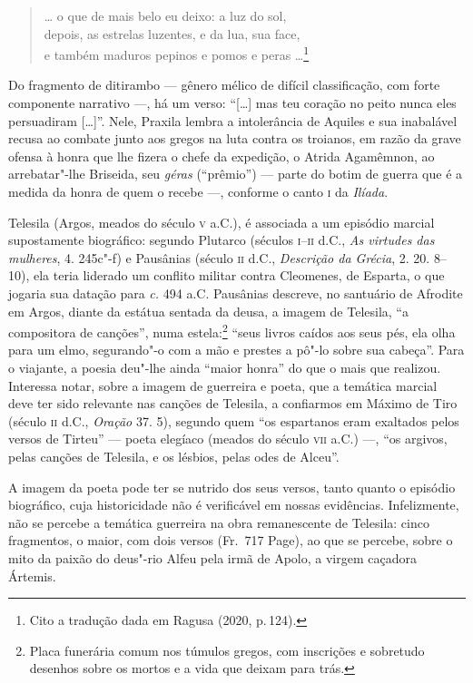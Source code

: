 \begin{quote}
\ldots{} o que de mais belo eu deixo: a luz do sol,\\
 depois, as estrelas luzentes, e da lua, sua face,\\
e também maduros pepinos e pomos e peras \ldots{}\footnote{Cito a tradução dada em Ragusa (2020, p.\,124).}
\end{quote}

Do fragmento de ditirambo --- gênero mélico de difícil classificação, com forte
componente narrativo ---, há um verso: ``[\ldots{}] mas teu coração no peito nunca
eles persuadiram [\ldots{}]”. Nele, Praxila lembra a intolerância de Aquiles e sua
inabalável recusa ao combate junto aos gregos na luta contra os troianos, em razão da
grave ofensa à honra que lhe fizera o chefe da expedição, o Atrida
Agamêmnon, ao arrebatar"-lhe Briseida, seu \textit{géras} (“prêmio”) --- parte do
botim de guerra que é a medida da honra de quem o recebe ---, conforme o canto \textsc{i}
da \textit{Ilíada}.

Telesila (Argos, meados do século \textsc{v} a.C.), é associada a um episódio marcial
supostamente biográfico: segundo Plutarco (séculos \textsc{i}--\textsc{ii} d.C., \textit{As
virtudes das mulheres}, 4. 245c"-f) e Pausânias (século \textsc{ii} d.C.,
\textit{Descrição da Grécia}, 2. 20. 8--10), ela teria liderado um conflito
militar contra Cleomenes, de Esparta, o que jogaria sua datação para \textit{c.}
494 a.C. Pausânias descreve, no santuário de Afrodite em Argos, diante da
estátua sentada da deusa, a imagem de Telesila, ``a compositora de
canções”, numa estela:\footnote{ Placa funerária comum nos túmulos gregos, com
inscrições e sobretudo desenhos sobre os mortos e a vida que deixam para trás.} ``seus livros caídos aos seus
pés, ela olha para um elmo, segurando"-o com a mão e prestes a pô"-lo sobre sua
cabeça”. Para o viajante, a poesia deu"-lhe ainda ``maior honra” do
que o mais que realizou. Interessa notar, sobre a imagem de guerreira e poeta,
que a temática marcial deve ter sido relevante nas canções de Telesila, a
confiarmos em Máximo de Tiro (século \textsc{ii} d.C., \textit{Oração} 37. 5), segundo
quem ``os espartanos eram exaltados pelos versos de Tirteu” --- 
poeta elegíaco (meados do século \textsc{vii} a.C.) ---, ``os argivos, pelas
canções de Telesila, e os lésbios, pelas odes de Alceu”. 

A imagem da poeta pode ter se nutrido dos
seus versos, tanto quanto o episódio biográfico, cuja historicidade não
é verificável em nossas evidências.
Infelizmente, não se percebe a temática guerreira na obra
remanescente de Telesila: cinco fragmentos, o maior, com dois versos (Fr.~717 Page),
ao que se percebe, sobre o mito da paixão do deus"-rio Alfeu pela irmã de Apolo,
a virgem caçadora Ártemis.

